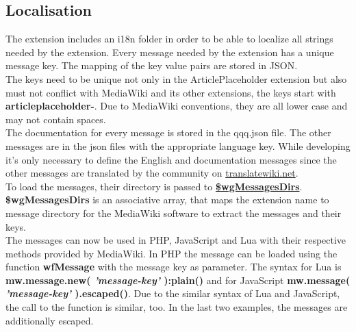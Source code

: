 \subsection{Localisation}

The extension includes an i18n folder in order to be able to localize all strings needed by the extension. Every message needed by the extension has a unique message key. The mapping of the key value pairs are stored in JSON. \\
The keys need to be unique not only in the ArticlePlaceholder extension but also must not conflict with MediaWiki and its other extensions, the keys start with \textbf{articleplaceholder-}. Due to MediaWiki conventions, they are all lower case and may not contain spaces.  \\
The documentation for every message is stored in the qqq.json file. The other messages are in the json files with the appropriate language key. While developing it's only necessary to define the English and documentation messages since the other messages are translated by the community on \href{https://translatewiki.net/}{translatewiki.net}. \\
To load the messages, their directory is passed to \href{https://www.mediawiki.org/wiki/Manual:$wgMessagesDirs}{\textbf{\$wgMessagesDirs}}. \textbf{\$wgMessagesDirs} is an associative array, that maps the extension name to message directory for the MediaWiki software to extract the messages and their keys. \\
The messages can now be used in PHP, JavaScript and Lua with their respective methods provided by MediaWiki. In PHP the message can be loaded using the function \textbf{wfMessage} with the message key as parameter. The syntax for Lua is \textbf{mw.message.new( \textit{'message-key'} ):plain()} and for JavaScript \textbf{mw.message( \textit{'message-key'} ).escaped()}. Due to the similar syntax of Lua and JavaScript, the call to the function is similar, too. In the last two examples, the messages are additionally escaped.